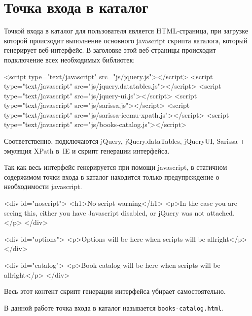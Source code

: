 \documentclass[a4paper,14pt,oneside]{extreport}
\begin{document}
\section{Точка входа в каталог}
Точкой входа в каталог для пользователя является HTML-страница, при загрузке которой происходит выполнение основного javascript скрипта каталога, который генерирует веб-интерфейс. В заголовке этой веб-страницы происходит подключение всех необходимых библиотек:
\begin{VerbatimCode}
  <script type="text/javascript" src="js/jquery.js"></script>
  <script type="text/javascript" src="js/jquery.datatables.js"></script>
  <script type="text/javascript" src="js/jquery-ui.js"></script>
  <script type="text/javascript" src="js/sarissa.js"></script>
  <script type="text/javascript" src="js/sarissa-ieemu-xpath.js"></script>
  <script type="text/javascript" src="js/books-catalog.js"></script>
\end{VerbatimCode}

Соответственно, подключаются jQuery, jQuery.dataTables, jQueryUI, Sarissa + эмуляция XPath в~IE и скрипт генерации интерфейса.

Так как весь интерфейс генерируется при помощи javascript, в статичном содержимом точки входа в каталог находится только предупреждение о необходимости javascript.
\begin{VerbatimCode}
  <div id="noscript">
    <h1>No script warning</h1>
    <p>In the case you are seeing this, either you have Javascript disabled,
     or jQuery was not attached.</p>
  </div>

  <div id="options">
    <p>Options will be here when scripts will be allright</p>
  </div>

  <div id="catalog">
    <p>Book catalog will be here when scripts will be allright</p>
  </div>
\end{VerbatimCode}

Весь этот контент скрипт генерации интерфейса убирает самостоятельно.

В данной работе точка входа в каталог называется \verb'books-catalog.html'.
\end{document}
